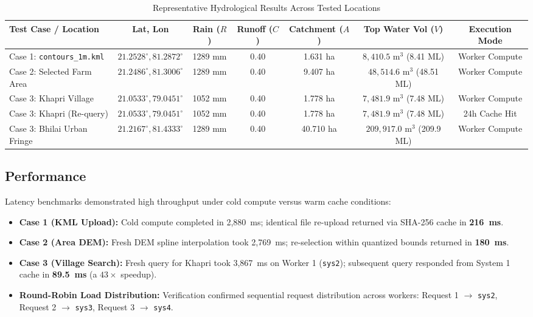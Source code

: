 \documentclass[manuscript,screen,review]{acmart}
\begin{document}
\begin{table}[h]
  \caption{Representative Hydrological Results Across Tested Locations}
  \label{tab:results}
  \small
  \begin{tabular}{lcccccc}
    \toprule
    Test Case / Location & Lat, Lon & Rain ($R$) & Runoff ($C$) & Catchment ($A$) & Top Water Vol ($V$) & Execution Mode \\
    \midrule
    Case 1: \texttt{contours\_1m.kml} & $21.2528^\circ, 81.2872^\circ$ & 1289 mm & 0.40 & 1.631 ha & $8,410.5\text{ m}^3$ (8.41 ML) & Worker Compute \\
    Case 2: Selected Farm Area & $21.2486^\circ, 81.3006^\circ$ & 1289 mm & 0.40 & 9.407 ha & $48,514.6\text{ m}^3$ (48.51 ML) & Worker Compute \\
    Case 3: Khapri Village & $21.0533^\circ, 79.0451^\circ$ & 1052 mm & 0.40 & 1.778 ha & $7,481.9\text{ m}^3$ (7.48 ML) & Worker Compute \\
    Case 3: Khapri (Re-query) & $21.0533^\circ, 79.0451^\circ$ & 1052 mm & 0.40 & 1.778 ha & $7,481.9\text{ m}^3$ (7.48 ML) & 24h Cache Hit \\
    Case 3: Bhilai Urban Fringe & $21.2167^\circ, 81.4333^\circ$ & 1289 mm & 0.40 & 40.710 ha & $209,917.0\text{ m}^3$ (209.9 ML) & Worker Compute \\
    \bottomrule
  \end{tabular}
\end{table}

\subsection{Performance}
Latency benchmarks demonstrated high throughput under cold compute versus warm cache conditions:
\begin{itemize}
    \item \textbf{Case 1 (KML Upload):} Cold compute completed in 2,880~ms; identical file re-upload returned via SHA-256 cache in \textbf{216~ms}.
    \item \textbf{Case 2 (Area DEM):} Fresh DEM spline interpolation took 2,769~ms; re-selection within quantized bounds returned in \textbf{180~ms}.
    \item \textbf{Case 3 (Village Search):} Fresh query for Khapri took 3,867~ms on Worker 1 (\texttt{sys2}); subsequent query responded from System 1 cache in \textbf{89.5~ms} (a $43\times$ speedup).
    \item \textbf{Round-Robin Load Distribution:} Verification confirmed sequential request distribution across workers: Request 1 $\to$ \texttt{sys2}, Request 2 $\to$ \texttt{sys3}, Request 3 $\to$ \texttt{sys4}.
\end{itemize}
\end{document}
